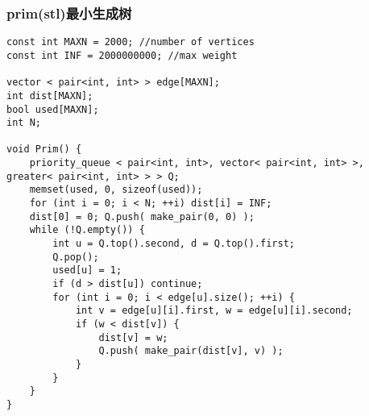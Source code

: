 \subsubsection{prim(stl)最小生成树}
\begin{verbatim}
const int MAXN = 2000; //number of vertices
const int INF = 2000000000; //max weight

vector < pair<int, int> > edge[MAXN];
int dist[MAXN];
bool used[MAXN];
int N;

void Prim() {
	priority_queue < pair<int, int>, vector< pair<int, int> >, greater< pair<int, int> > > Q;
	memset(used, 0, sizeof(used));
	for (int i = 0; i < N; ++i) dist[i] = INF;
	dist[0] = 0; Q.push( make_pair(0, 0) );
	while (!Q.empty()) {
		int u = Q.top().second, d = Q.top().first;
		Q.pop();
		used[u] = 1;
		if (d > dist[u]) continue;
		for (int i = 0; i < edge[u].size(); ++i) {
			int v = edge[u][i].first, w = edge[u][i].second;
			if (w < dist[v]) {
				dist[v] = w;
				Q.push( make_pair(dist[v], v) );
			}
		}
	}
}
\end{verbatim}
